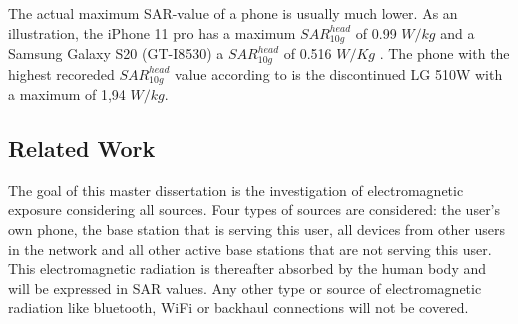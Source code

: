 The actual maximum \gls{SAR}-value of a phone is usually much lower. As an illustration, the 
iPhone 11 pro has a maximum $SAR_{10g}^{head}$ of 0.99 $W/kg$ \cite{S21} and a Samsung Galaxy S20 (GT-I8530) a
 $SAR_{10g}^{head}$ of 0.516 $W/Kg$ \cite{S22,SARDatabase}. The phone with the highest recoreded $SAR_{10g}^{head}$ value 
 according to \cite{SARDatabase} is the discontinued LG 510W with a maximum of 1,94 $W/kg$.

\subsection{Related Work} %
\label{sub:general}
The goal of this master dissertation is the investigation of electromagnetic exposure considering all sources. Four types of sources are considered: the user's own phone,
 the base station that is serving this user, 
all devices from other users in the network and all 
other active base stations that are not serving this user. This electromagnetic radiation is thereafter
absorbed by the human body and will be expressed in SAR values. 
Any other type or source of electromagnetic radiation like bluetooth, WiFi or backhaul connections will not be covered.

